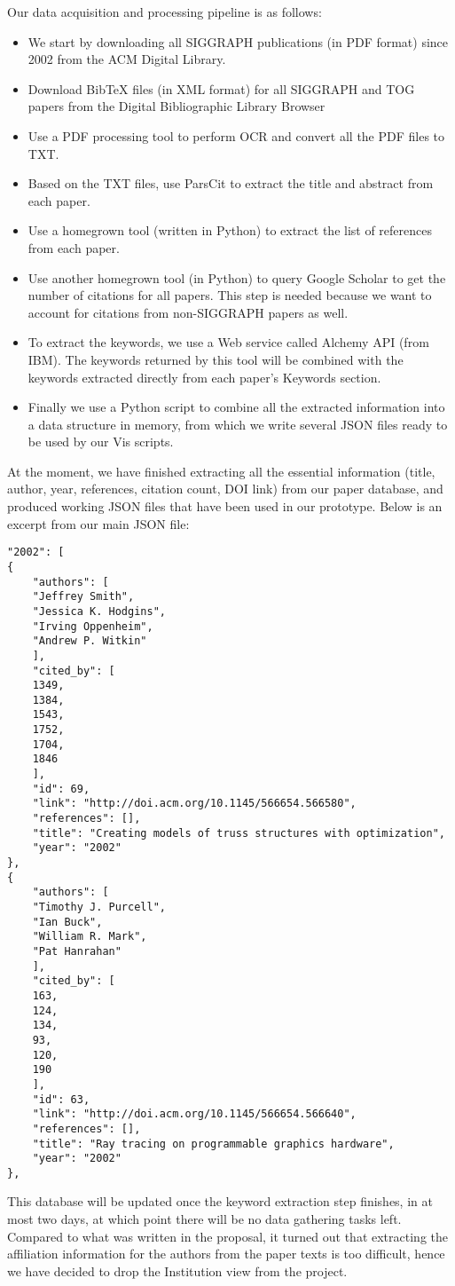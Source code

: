 Our data acquisition and processing pipeline is as follows:
\begin{itemize}
    \item We start by downloading all SIGGRAPH publications (in PDF format) since 2002 from the ACM Digital Library. 
    \item Download BibTeX files (in XML format) for all SIGGRAPH and TOG papers from the Digital Bibliographic Library Browser
    \item Use a PDF processing tool to perform OCR and convert all the PDF files to TXT.
    \item Based on the TXT files, use ParsCit to extract the title and abstract from each paper.
    \item Use a homegrown tool (written in Python) to extract the list of references from each paper.
    \item Use another homegrown tool (in Python) to query Google Scholar to get the number of citations for all papers. This step is needed because we want to account for citations from non-SIGGRAPH papers as well.
    \item To extract the keywords, we use a Web service called Alchemy API (from IBM). The keywords returned by this tool will be combined with the keywords extracted directly from each paper's Keywords section.
    \item Finally we use a Python script to combine all the extracted information into a data structure in memory, from which we write several JSON files ready to be used by our Vis scripts.
\end{itemize}

At the moment, we have finished extracting all the essential information (title, author, year, references, citation count, DOI link) from our paper database, and produced working JSON files that have been used in our prototype. Below is an excerpt from our main JSON file:

\begin{lstlisting}
"2002": [
{
    "authors": [
    "Jeffrey Smith", 
    "Jessica K. Hodgins", 
    "Irving Oppenheim", 
    "Andrew P. Witkin"
    ], 
    "cited_by": [
    1349, 
    1384, 
    1543, 
    1752, 
    1704, 
    1846
    ], 
    "id": 69, 
    "link": "http://doi.acm.org/10.1145/566654.566580", 
    "references": [], 
    "title": "Creating models of truss structures with optimization", 
    "year": "2002"
}, 
{
    "authors": [
    "Timothy J. Purcell", 
    "Ian Buck", 
    "William R. Mark", 
    "Pat Hanrahan"
    ], 
    "cited_by": [
    163, 
    124, 
    134, 
    93, 
    120, 
    190
    ], 
    "id": 63, 
    "link": "http://doi.acm.org/10.1145/566654.566640", 
    "references": [], 
    "title": "Ray tracing on programmable graphics hardware", 
    "year": "2002"
}, 
\end{lstlisting}

This database will be updated once the keyword extraction step finishes, in at most two days, at which point there will be no data gathering tasks left. Compared to what was written in the proposal, it turned out that extracting the affiliation information for the authors from the paper texts is too difficult, hence we have decided to drop the Institution view from the project.